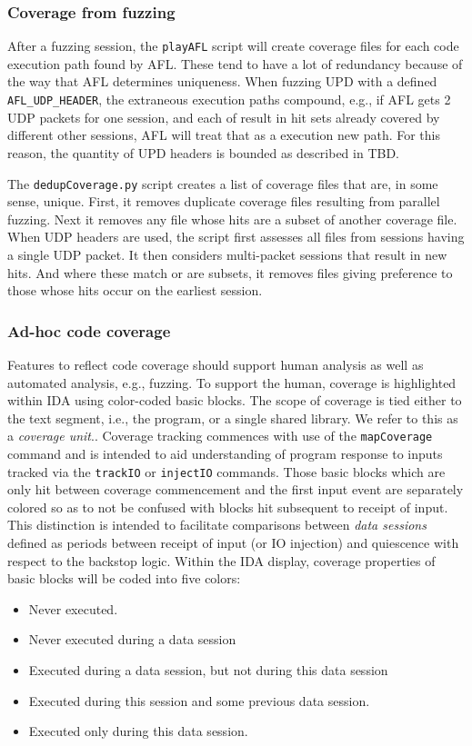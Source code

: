 \documentclass[titlepage]{article}
\begin{document}
\subsubsection{Coverage from fuzzing}
After a fuzzing session, the {\tt playAFL} script will create coverage files for each code execution path found by AFL.  These tend to have a lot of
redundancy because of the way that AFL determines uniqueness.  When fuzzing UPD with a defined {\tt AFL\_UDP\_HEADER}, the extraneous execution paths compound,
e.g., if AFL gets 2 UDP packets for one session, and each of result in hit sets already covered by different other sessions, AFL will treat that as a execution
new path.  For this reason, the quantity of UPD headers is bounded as described in TBD.  

The {\tt dedupCoverage.py} script creates a list of coverage files that are, in some sense, unique.  First, it removes duplicate coverage files resulting from
parallel fuzzing.  Next it removes any file whose hits are a subset of another coverage file.  When UDP headers are used, the script first assesses all files from
sessions having a single UDP packet.  It then considers multi-packet sessions that result in new hits.  And where these match or are subsets, it removes files 
giving preference to those whose hits occur on the earliest session.

\subsubsection{Ad-hoc code coverage}
Features to reflect code coverage should support human analysis as well as automated analysis, e.g., fuzzing.  To support the human, coverage is highlighted within IDA using color-coded
basic blocks.  The scope of coverage is tied either to the text segment, i.e., the program, or a single shared library.  We refer to this as a \textit{coverage unit}..  
Coverage tracking commences with use of the {\tt mapCoverage} command and is intended to aid understanding of program response to inputs tracked via 
the {\tt trackIO} or {\tt injectIO} commands.  Those basic blocks which are only hit between coverage commencement and the first input event are separately colored so as to not
be confused with blocks hit subsequent to receipt of input.  This distinction is intended to facilitate comparisons between \textit{data sessions} defined as periods
between receipt of input (or IO injection) and quiescence with respect to the backstop logic.
Within the IDA display, coverage properties of basic blocks will be
coded into five colors:
\begin{itemize}
\item Never executed.
\item Never executed during a data session
\item Executed during a data session, but not during this data session
\item Executed during this session and some previous data session.
\item Executed only during this data session.
\end{itemize}
\end{document}
